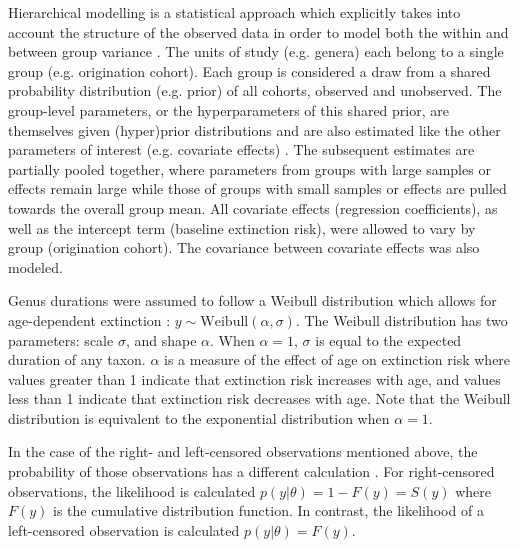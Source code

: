 \documentclass[11pt]{article}
\begin{document}
Hierarchical modelling is a statistical approach which explicitly takes into account the structure of the observed data in order to model both the within and between group variance \citep{Gelman2013d,Gelman2007}. The units of study (e.g. genera) each belong to a single group (e.g. origination cohort). Each group is considered a draw from a shared probability distribution (e.g. prior) of all cohorts, observed and unobserved. The group-level parameters, or the hyperparameters of this shared prior, are themselves given (hyper)prior distributions and are also estimated like the other parameters of interest (e.g. covariate effects) \citep{Gelman2013d}. The subsequent estimates are partially pooled together, where parameters from groups with large samples or effects remain large while those of groups with small samples or effects are pulled towards the overall group mean. All covariate effects (regression coefficients), as well as the intercept term (baseline extinction risk), were allowed to vary by group (origination cohort). The covariance between covariate effects was also modeled. 

Genus durations were assumed to follow a Weibull distribution which allows for age-dependent extinction \citep{Klein2003}: \(y \sim \mathrm{Weibull}(\alpha, \sigma)\). The Weibull distribution has two parameters: scale \(\sigma\), and shape \(\alpha\). When \(\alpha = 1\), \(\sigma\) is equal to the expected duration of any taxon. \(\alpha\) is a measure of the effect of age on extinction risk where values greater than 1 indicate that extinction risk increases with age, and values less than 1 indicate that extinction risk decreases with age. Note that the Weibull distribution is equivalent to the exponential distribution when \(\alpha = 1\). 

In the case of the right- and left-censored observations mentioned above, the probability of those observations has a different calculation \citep{Klein2003}. For right-censored observations, the likelihood is calculated \(p(y | \theta) = 1 - F(y) = S(y)\) where \(F(y)\) is the cumulative distribution function. In contrast, the likelihood of a left-censored observation is calculated \(p(y | \theta) = F(y)\).
\end{document}
